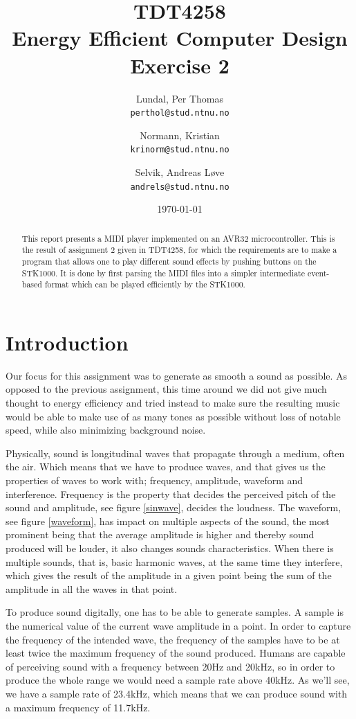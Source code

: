 \documentclass[a4paper,12pt]{article}
\title{TDT4258 \\ Energy Efficient Computer Design \\ Exercise 2}
\author{
    Lundal, Per Thomas \\ \texttt{perthol@stud.ntnu.no}
    \and
    Normann, Kristian \\ \texttt{krinorm@stud.ntnu.no}
    \and
    Selvik, Andreas Løve \\ \texttt{andrels@stud.ntnu.no}
}
\date{\today}
\begin{document}
\maketitle
\clearpage
\begin{abstract}

This report presents a MIDI player implemented on an AVR32 microcontroller. This is the result of assignment 2 given in TDT4258, for which the requirements are to make a program that allows one to play different sound effects by pushing buttons on the STK1000. It is done by first parsing the MIDI files into a simpler intermediate event-based format which can be played efficiently by the STK1000.

\end{abstract}

\clearpage
\tableofcontents

\clearpage
\section{Introduction}
Our focus for this assignment was to generate as smooth a sound as possible. As opposed to the previous assignment, this time around we did not give much thought to energy efficiency and tried instead to make sure the resulting music would be able to make use of as many tones as possible without loss of notable speed, while also minimizing background noise.

Physically, sound is longitudinal waves that propagate through a medium, often the air. Which means that we have to produce waves, and that gives us the properties of waves to work with; frequency, amplitude, waveform and interference. Frequency is the property that decides the perceived pitch of the sound and  amplitude, see figure \ref{sinwave}, decides the loudness. The waveform, see figure \ref{waveform}, has impact on multiple aspects of the sound, the most prominent being that the average amplitude is higher and thereby sound produced will be louder, it also changes sounds characteristics. When there is multiple sounds, that is, basic harmonic waves, at the same time they interfere, which gives the result of the amplitude in a given point being the sum of the amplitude in all the waves in that point. 

To produce sound digitally, one has to be able to generate samples. A sample is the numerical value of the current wave amplitude in a point. In order to capture the frequency of the intended wave, the frequency of the samples have to be at least twice the maximum frequency of the sound produced. Humans are capable of perceiving sound with a frequency between 20Hz and 20kHz, so in order to produce the whole range we would need a sample rate above 40kHz. As we’ll see, we have a sample rate of 23.4kHz, which means that we can produce sound with a maximum frequency of 11.7kHz. 
\end{document}

